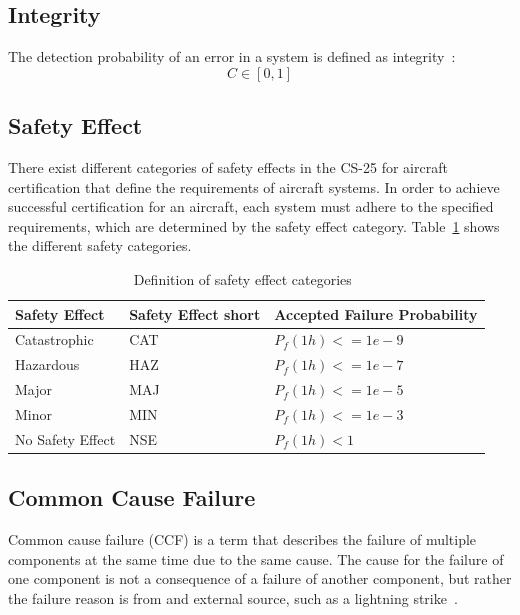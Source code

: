 \subsection{Integrity}\label{subsec:integrity}
The detection probability of an error in a system is defined as integrity~\cite{lfs2}:
\begin{equation}
    \label{eq:integrity}
    C \in [0,1]
\end{equation}
\subsection{Safety Effect}\label{subsec:safety-effect}
There exist different categories of safety effects in the CS-25 for aircraft certification that define the requirements of aircraft systems.
In order to achieve successful certification for an aircraft, each system must adhere to the specified requirements, which are determined by the safety effect category.
Table~\ref{tab:safety-effect} shows the different safety categories.
\begin{table}[!htb]
    \centering
    \begin{tabular}{l|l|l}
        Safety Effect    & Safety Effect short & Accepted Failure Probability \\ \hline
        Catastrophic     & CAT                 & $P_f(1h) <= 1e-9$           \\
        Hazardous        & HAZ                 & $P_f(1h) <= 1e-7$           \\
        Major            & MAJ                 & $P_f(1h) <= 1e-5$           \\
        Minor            & MIN                 & $P_f(1h) <= 1e-3$           \\
        No Safety Effect & NSE                 & $P_f(1h) < 1$
    \end{tabular}
    \caption{Definition of safety effect categories~\cite{lfs1}}
    \label{tab:safety-effect}
\end{table}
\subsection{Common Cause Failure}\label{subsec:common-cause-failure}
Common cause failure (CCF) is a term that describes the failure of multiple components at the same time due to the same cause.
The cause for the failure of one component is not a consequence of a failure of another component, but rather the failure reason is from and
external source, such as a lightning strike~\cite{ccf,cmf}.


